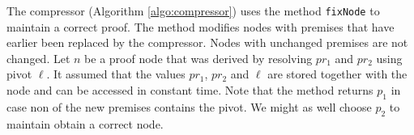 

The compressor (Algorithm \ref{algo:compressor}) uses the method \texttt{fixNode} to maintain a correct proof.
The method modifies nodes with premises that have earlier been replaced by the compressor. 
Nodes with unchanged premises are not changed.
Let $n$ be a proof node that was derived by resolving $pr_1$ and $pr_2$ using pivot $\ell$.
It assumed that the values $pr_1$, $pr_2$ and $\ell$ are stored together with the node and can be accessed in constant time.
Note that the method returns $p_1$ in case non of the new premises contains the pivot.
We might as well choose $p_2$ to maintain obtain a correct node.



\FloatBarrier